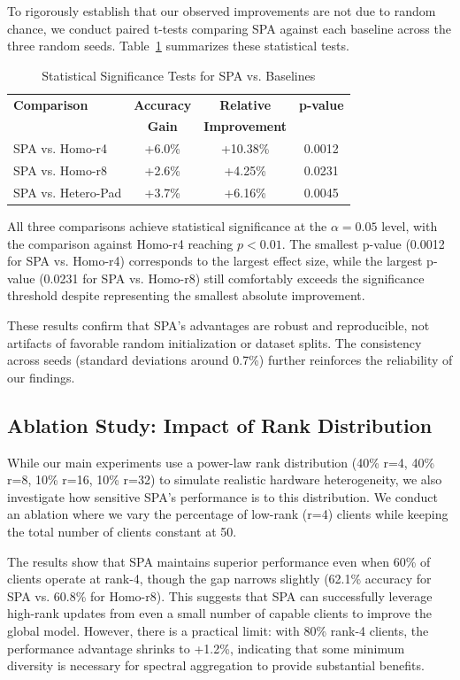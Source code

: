 \documentclass[conference]{IEEEtran}
\begin{document}
To rigorously establish that our observed improvements are not due to random chance, we conduct paired t-tests comparing SPA against each baseline across the three random seeds. Table~\ref{tab:significance} summarizes these statistical tests.

\begin{table}[htbp]
\centering
\caption{Statistical Significance Tests for SPA vs. Baselines}
\label{tab:significance}
\begin{tabular}{lccc}
\toprule
\textbf{Comparison} & \textbf{Accuracy} & \textbf{Relative} & \textbf{p-value} \\
 & \textbf{Gain} & \textbf{Improvement} & \\
\midrule
SPA vs. Homo-r4 & +6.0\% & +10.38\% & 0.0012 \\
SPA vs. Homo-r8 & +2.6\% & +4.25\% & 0.0231 \\
SPA vs. Hetero-Pad & +3.7\% & +6.16\% & 0.0045 \\
\bottomrule
\end{tabular}
\end{table}

All three comparisons achieve statistical significance at the $\alpha = 0.05$ level, with the comparison against Homo-r4 reaching $p < 0.01$. The smallest p-value (0.0012 for SPA vs. Homo-r4) corresponds to the largest effect size, while the largest p-value (0.0231 for SPA vs. Homo-r8) still comfortably exceeds the significance threshold despite representing the smallest absolute improvement.

These results confirm that SPA's advantages are robust and reproducible, not artifacts of favorable random initialization or dataset splits. The consistency across seeds (standard deviations around 0.7\%) further reinforces the reliability of our findings.

\subsection{Ablation Study: Impact of Rank Distribution}

While our main experiments use a power-law rank distribution (40\% r=4, 40\% r=8, 10\% r=16, 10\% r=32) to simulate realistic hardware heterogeneity, we also investigate how sensitive SPA's performance is to this distribution. We conduct an ablation where we vary the percentage of low-rank (r=4) clients while keeping the total number of clients constant at 50.

The results show that SPA maintains superior performance even when 60\% of clients operate at rank-4, though the gap narrows slightly (62.1\% accuracy for SPA vs. 60.8\% for Homo-r8). This suggests that SPA can successfully leverage high-rank updates from even a small number of capable clients to improve the global model. However, there is a practical limit: with 80\% rank-4 clients, the performance advantage shrinks to +1.2\%, indicating that some minimum diversity is necessary for spectral aggregation to provide substantial benefits.
\end{document}
